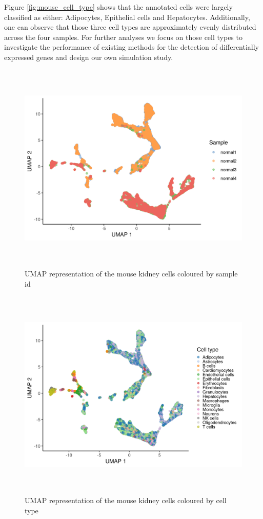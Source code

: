 Figure \ref{fig:mouse_cell_type} shows that the annotated cells were largely classified as either: Adipocytes, Epithelial cells and Hepatocytes. Additionally, one can observe that those three cell types are approximately evenly distributed across the four samples. For further analyses we focus on those cell types to investigate the performance of existing methods for the detection of differentially expressed genes and design our own simulation study.

\begin{figure}[!htb]
\begin{center}
\includegraphics[width=6in,height=4in]{figure/kidney_mouse/UMAP_mouse_sample_id.png}
\end{center}
\caption{UMAP representation of the mouse kidney cells coloured by sample id}
\label{fig:UMAP_mouse_sample_id}
\end{figure}
\FloatBarrier

\begin{figure}[!htb]
\begin{center}
\includegraphics[width=6in,height=4in]{figure/kidney_mouse/UMAP_mouse_cell_type.png}
\end{center}
\caption{UMAP representation of the mouse kidney cells coloured by cell type}
\label{fig:UMAP_mouse_cell_type}
\end{figure}
\FloatBarrier

